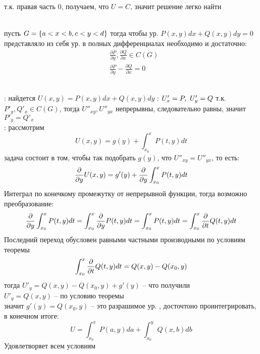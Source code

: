 т.к. правая часть 0, получаем, что $U = C$, значит решение легко найти

\begin{theorem}  \\
пусть $G = \left\{  a < x < b, c < y < d \right\}$ тогда чтобы ур. $P(x, y)dx + Q(x, y) dy = 0$ представляло из себя ур. в полных дифференциалах необходимо и достаточно:
\begin{align}
    & \frac{\partial P}{\partial y} , \frac{\partial Q}{\partial x} \in C(G) \\
    & \frac{\partial P}{\partial y} - \frac{\partial Q}{\partial x}  = 0 
\end{align}
\end{theorem}
\beginproof \\
: найдется $U(x, y) = P(x, y) dx + Q(x, y) dy$ : $U'_x = P, ~ U'_y \hm{=} Q$ т.к. $P'_y , Q'_x \in C(G)$, тогда $U''_{xy} , U''_{yx}$ непрерывны, следовательно равны, значит $P'_{y} = Q'_{x}$ \\
: рассмотрим 
\begin{equation}
    U(x, y) = g(y) + \int_{x_0}^{x} P(t, y)dt
\end{equation}
задача состоит в том, чтобы так подобрать $g(y)$, что $U''_{xy}=  U''_{yx}$, то есть:
\begin{equation}
    \frac{\partial}{\partial y} U(x, y) =  g'(y) + \frac{\partial}{\partial y} \int_{x_0}^{x} P(t, y)dt
\end{equation}
Интеграл по конечкому промежутку от непрерывной функции, тогда возможно преобразование:
\begin{equation}
     \frac{\partial}{\partial y}\int_{x_0}^{x} P(t, y)dt  = \int_{x_0}^{x}  \frac{\partial}{\partial y} P(t, y)dt = \int_{x_0}^{x} P(t, y)dt = \int_{x_0}^{x}  \frac{\partial}{\partial t} Q(t, y) dt
\end{equation}
Последний переход обусловен равными частными производными по условиям теоремы
\begin{equation}
\int_{x_0}^{x}  \frac{\partial}{\partial t} Q(t, y) dt = Q(x, y) - Q(x_0 , y)    
\end{equation}
тогда $U'_y =  Q(x, y) - Q(x_0, y) +  g'(y)$ -- что получили\\
$U'_y = Q (x , y)$ -- по условию теоремы\\
значит $g'(y) =  Q(x_0 , y)$ -- это разрашимое ур. , досточтоно проинтегрировать, в конечном итоге:
\begin{equation}
    U = \int_{x_0}^{x} P(a, y) da + \int_{x_0}^{y} Q(x, b) db
\end{equation}
Удовлетворяет всем условиям

